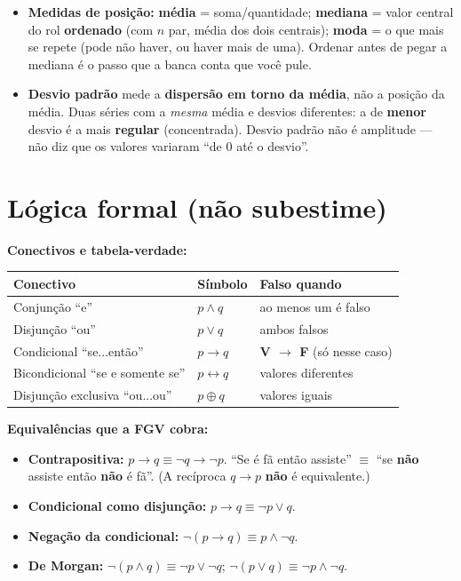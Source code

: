 \begin{itemize}
\item \textbf{Medidas de posição:} \textbf{média} = soma/quantidade;
\textbf{mediana} = valor central do rol \textbf{ordenado} (com $n$ par, média
dos dois centrais); \textbf{moda} = o que mais se repete (pode não haver, ou
haver mais de uma). Ordenar antes de pegar a mediana é o passo que a banca
conta que você pule.
\item \textbf{Desvio padrão} mede a \textbf{dispersão em torno da média}, não
a posição da média. Duas séries com a \emph{mesma} média e desvios
diferentes: a de \textbf{menor} desvio é a mais \textbf{regular}
(concentrada). Desvio padrão não é amplitude --- não diz que os valores
variaram ``de 0 até o desvio''.
\end{itemize}

\section{Lógica formal (não subestime)}

\textbf{Conectivos e tabela-verdade:}

\begin{center}
\begin{tabular}{@{}p{4.2cm}p{1.6cm}p{4.2cm}@{}}
\toprule
\textbf{Conectivo} & \textbf{Símbolo} & \textbf{Falso quando} \\
\midrule
Conjunção ``e'' & $p \land q$ & ao menos um é falso \\
Disjunção ``ou'' & $p \lor q$ & ambos falsos \\
Condicional ``se...então'' & $p \to q$ & \textbf{V $\to$ F} (só nesse caso) \\
Bicondicional ``se e somente se'' & $p \leftrightarrow q$ & valores diferentes \\
Disjunção exclusiva ``ou...ou'' & $p \oplus q$ & valores iguais \\
\bottomrule
\end{tabular}
\end{center}

\textbf{Equivalências que a FGV cobra:}

\begin{itemize}
\item \textbf{Contrapositiva:} $p \to q \equiv \lnot q \to \lnot p$. ``Se é
fã então assiste'' $\equiv$ ``se \textbf{não} assiste então \textbf{não} é
fã''. (A recíproca $q \to p$ \textbf{não} é equivalente.)
\item \textbf{Condicional como disjunção:} $p \to q \equiv \lnot p \lor q$.
\item \textbf{Negação da condicional:} $\lnot(p \to q) \equiv p \land \lnot
q$.
\item \textbf{De Morgan:} $\lnot(p \land q) \equiv \lnot p \lor \lnot q$;
$\lnot(p \lor q) \equiv \lnot p \land \lnot q$.
\end{itemize}

